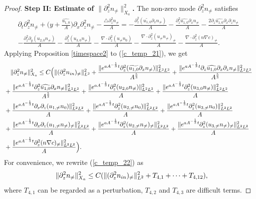 \documentclass[12pt, reqno]{amsart}
\numberwithin{equation}{section}
\begin{document}
\begin{proof}
		
		{\bf Step II: Estimate of $\|\partial_z^2n_{\neq}\|^2_{X_a}$.}
		The non-zero mode $\partial_z^2n_{\neq}$ satisfies 
		\begin{equation}\label{c_temp_21}
			\begin{aligned}
				\partial_t\partial_z^2n_{\neq}+\Big(y+\frac{\widehat{u_{1,0}}}{A}
				\Big)\partial_x\partial_z^2 n_{\neq}-\frac{\triangle \partial_z^2n_{\neq}}{A}=-\frac{\partial_z^2(\widetilde{u_{1,0}}\partial_x n_{\neq})}{A}
				-\frac{\partial_z^2\widehat{u_{1,0}}\partial_x n_{\neq}}{A}
				-\frac{2\partial_z\widehat{u_{1,0}}\partial_x\partial_z n_{\neq}}{A}
				\\-\frac{\partial_z^2\partial_y(u_{2,0}n_{\neq})}{A}
				-\frac{\partial_z^3(
					u_{3,0}n_{\neq})}{A}
				-\frac{\nabla\cdot\partial_z^2(u_{\neq}n_0)}{A}
				-\frac{\nabla\cdot\partial_z^2(u_{\neq}n_{\neq})_{\neq}}{A}
				-\frac{\nabla\cdot\partial_z^2(n\nabla c)_{\neq}}{A}.
			\end{aligned}
		\end{equation}
		Applying Proposition \ref{timespace2} to (\ref{c_temp_21}), we get
		\begin{equation}\label{c_temp_22}
			\begin{aligned}
				&\quad\|\partial_z^2n_{\neq}\|^2_{X_a}\leq C
				\Big( \|(\partial_z^2n_{\rm in})_{\neq}\|^2_{L^2}
				+\frac{	\|{\rm e}^{aA^{-\frac{1}{3}}t}\partial_z^2(\widetilde{u_{1,0}}\partial_x n_{\neq})\|_{L^2L^2}^2}{A^{\frac{5}{3}}}
				+\frac{\|{\rm e}^{aA^{-\frac{1}{3}}t}
					\partial_z\widehat{u_{1,0}}\partial_x\partial_z n_{\neq}\|_{L^2L^2}^2}{A^{\frac{5}{3}}}\\
				&+\frac{\|{\rm e}^{aA^{-\frac{1}{3}}t}
					\partial_z^2\widehat{u_{1,0}}\partial_x n_{\neq}\|_{L^2L^2}^2}{A^{\frac{5}{3}}}		
				+\frac{\|{\rm e}^{aA^{-\frac{1}{3}}t}\partial_z^2(u_{2,0}
					n_{\neq})\|_{L^2L^2}^2}{A}
				+\frac{\|{\rm e}^{aA^{-\frac{1}{3}}t}\partial_z^2(u_{3,0}
					n_{\neq})\|_{L^2L^2}^2}{A}\\
				&+\frac{\|{\rm e}^{aA^{-\frac{1}{3}}t}
					\partial_x\partial_z(u_{1,\neq}n_{0})\|_{L^2L^2}^2}{A}
				+\frac{\|{\rm e}^{aA^{-\frac{1}{3}}t}
					\partial_z^2(u_{2,\neq}n_{0})\|_{L^2L^2}^2}{A}
				+\frac{\|{\rm e}^{aA^{-\frac{1}{3}}t}
					\partial_z^2(u_{3,\neq}n_0)\|_{L^2L^2}^2}{A}\\
				&+\frac{\|{\rm e}^{aA^{-\frac{1}{3}}t}
					\partial_x\partial_z(u_{1,\neq}n_{\neq})_{\neq}\|^2_{L^2L^2}}{A}
				+\frac{\|{\rm e}^{aA^{-\frac{1}{3}}t}
					\partial_z^2(u_{2,\neq}n_{\neq})_{\neq}\|^2_{L^2L^2}}{A}
				+\frac{\|{\rm e}^{aA^{-\frac{1}{3}}t}
					\partial_z^2(u_{3,\neq}n_{\neq})_{\neq}\|^2_{L^2L^2}}{A}\\
				&+\frac{\|{\rm e}^{aA^{-\frac{1}{3}}t}
					\partial_z^2(n\nabla c)_{\neq}\|^2_{L^2L^2}}{A}\Big).
			\end{aligned}
		\end{equation}
		For convenience, we rewrite (\ref{c_temp_22}) as 
		$$\quad\|\partial_z^2n_{\neq}\|^2_{X_a}\leq C(\|(\partial_z^2n_{\rm in})_{\neq}\|^2_{L^2}+T_{4,1}+\cdots+T_{4,12}),$$
		where $T_{4,1}$ can be regarded as a perturbation, $T_{4,2}$ and $T_{4,3}$ are difficult terms. 
		

\end{proof}
\end{document}

